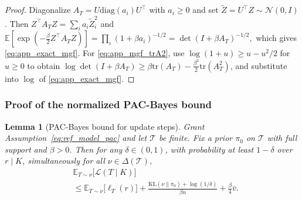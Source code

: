 \documentclass{article}
\theoremstyle{plain}
\newtheorem{lemma}[theorem]{Lemma}
\theoremstyle{definition}
\theoremstyle{remark}
\begin{document}
\begin{proof}
Diagonalize $A_T=U\mathrm{diag}(a_i)U^\top$ with $a_i\ge 0$ and set $\widetilde Z=U^\top Z\sim\mathcal N(0,I)$.
Then $Z^\top A_T Z=\sum_i a_i \widetilde Z_i^2$ and
$
\mathbb E[\exp(-\frac{\beta}{2}Z^\top A_T Z)]
=\prod_i (1+\beta a_i)^{-1/2}=\det(I+\beta A_T)^{-1/2},
$
which gives \eqref{eq:app_exact_mgf}.
For \eqref{eq:app_mgf_trA2}, use $\log(1+u)\ge u-u^2/2$ for $u\ge 0$ to obtain
$\log\det(I+\beta A_T)\ge \beta\mathrm{tr}(A_T)-\frac{\beta^2}{2}\mathrm{tr}(A_T^2)$,
and substitute into $\log$ of \eqref{eq:app_exact_mgf}.
\end{proof}

\subsubsection{Proof of the normalized PAC-Bayes bound}
\label{app:pac_proof_main}


\begin{lemma}[PAC-Bayes bound for update steps]
\label{thm:app_pac_norm}
Grant Assumption~\ref{eq:ref_model_pac} and let $\mathcal T$ be finite.
Fix a prior $\pi_0$ on $\mathcal T$ with full support and $\beta>0$.
Then for any $\delta\in(0,1)$, with probability at least $1-\delta$ over $r\mid K$, simultaneously for all
$\nu\in\Delta(\mathcal T)$,
\begin{align}
&\mathbb E_{T\sim\nu}\bigl[\mathcal L(T\mid K)\bigr]
\\ 
&\le
\mathbb E_{T\sim\nu}\bigl[\ell_T(r)\bigr]
+\frac{\mathrm{KL}(\nu\|\pi_0)+\log(1/\delta)}{\beta n}
+\frac{\beta}{4} \bar v.
\label{eq:app_pac_norm_bound}
\end{align}
\end{lemma}
\end{document}
